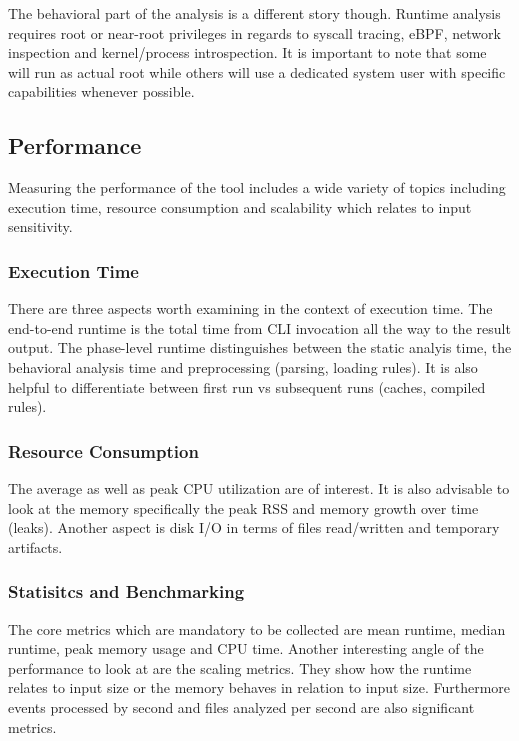 The behavioral part of the analysis is a different story though. Runtime analysis requires root or near-root privileges in regards to syscall tracing, eBPF, network inspection and kernel/process introspection. It is important to note that some will run as actual root while others will use a dedicated system user with specific capabilities whenever possible.

\subsection{Performance}

Measuring the performance of the tool includes a wide variety of topics including execution time, resource consumption and scalability which relates to input sensitivity.

\subsubsection{Execution Time}

There are three aspects worth examining in the context of execution time. The end-to-end runtime is the total time from CLI invocation all the way to the result output. The phase-level runtime distinguishes between the static analyis time, the behavioral analysis time and preprocessing (parsing, loading rules). It is also helpful to differentiate between first run vs subsequent runs (caches, compiled rules).

\subsubsection{Resource Consumption}

The average as well as peak CPU utilization are of interest. It is also advisable to look at the memory specifically the peak RSS and memory growth over time (leaks). Another aspect is disk I/O in terms of files read/written and temporary artifacts.

\subsubsection{Statisitcs and Benchmarking}

The core metrics which are mandatory to be collected are mean runtime, median runtime, peak memory usage and CPU time. Another interesting angle of the performance to look at are the scaling metrics. They show how the runtime relates to input size or the memory behaves in relation to input size. Furthermore events processed by second and files analyzed per second are also significant metrics.








